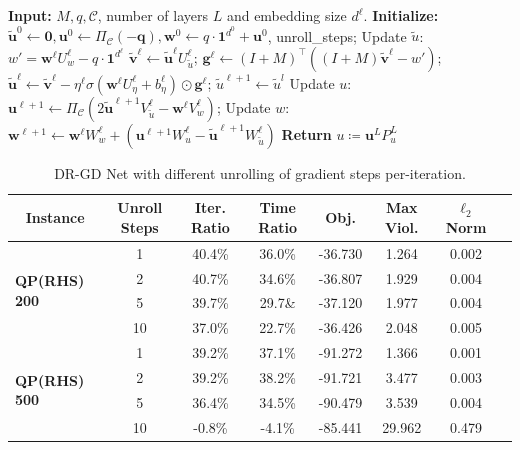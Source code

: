 \documentclass[10pt]{article} %
\begin{document}
\begin{algorithm}[h!]
\caption{DR-GD Net with multi-gradient steps}\label{alg:network_multistep}
\begin{algorithmic}[1]
\STATE \textbf{Input:} $M, q, \mathcal{C}$, number of layers $L$ and embedding size $d^\ell$.
\STATE \textbf{Initialize:} $\tilde{\mathbf{u}}^0 \gets \mathbf{0}, \mathbf{u}^0 \gets \Pi_\mathcal{C}(-\mathbf{q}), \mathbf{w}^0 \gets q \cdot \mathbf{1}^{d^0} + \mathbf{u}^0$, unroll\_steps; 
    \STATE Update $\tilde{u}$: $w'=\mathbf{w}^{\ell}U_w^\ell-q\cdot\mathbf{1}^{d^\ell}$ 
        \STATE $\tilde{\mathbf{v}}^{\ell} \gets \tilde{\mathbf{u}}^{\ell}U_{\tilde{u}}^\ell$;
        \STATE $\mathbf{g}^{\ell} \gets (I+M)^\top\left((I+M)\tilde{\mathbf{v}}^{\ell} - w'\right)$;
        \STATE $\tilde{\mathbf{u}}^{\ell} \gets \tilde{\mathbf{v}}^{\ell} - \eta^\ell\sigma\left(\mathbf{w}^{\ell}U_\eta^\ell + b_\eta^\ell\right) \odot \mathbf{g}^{\ell}$;
    \ENDFOR
    \STATE $\tilde{u}^{\ell+1} \gets \tilde{u}^l$
    \STATE Update $u$: $\mathbf{u}^{\ell+1} \gets \Pi_\mathcal{C} \left(2\tilde{\mathbf{u}}^{\ell+1} V_{\tilde{u}}^\ell - \mathbf{w}^{\ell}V_w^\ell \right)$;
    \STATE Update $w$: $\mathbf{w}^{\ell+1} \gets \mathbf{w}^{\ell}W_w^\ell + \left(\mathbf{u}^{\ell+1} W_u^\ell - \tilde{\mathbf{u}}^{\ell+1} W_{\tilde{u}}^\ell \right)$
\ENDFOR
\STATE \textbf{Return} $u \coloneqq \mathbf{u}^L P_u^{L}$
\end{algorithmic}
\end{algorithm}

\begin{table}[h!]
\centering
\caption{DR-GD Net with different unrolling of gradient steps per-iteration.}
\label{tab:unroll_steps_quality}
	\begin{tabular}{@{}l c c c c c c c}
    \toprule
       \multicolumn{1}{c}{\bf Instance} & \multicolumn{1}{c}{\bf Unroll Steps} & \multicolumn{1}{c}{\bf Iter. Ratio} &\multicolumn{1}{c}{\bf Time Ratio}& \multicolumn{1}{c}{\bf Obj.} &\multicolumn{1}{c}{\bf Max Viol.} &\multicolumn{1}{c}{\bf $\ell_2$ Norm} \\
        \midrule
        \multirow{4}{*}{\textbf{QP(RHS) 200}}
        & 1 &40.4\% & 36.0\% & -36.730 & 1.264 & 0.002\\
        &2 & 40.7\% & 34.6\%& -36.807 & 1.929 & 0.004 \\
        &5 & 39.7\% & 29.7\&& -37.120 & 1.977 & 0.004 \\
        &10& 37.0\% & 22.7\%& -36.426 & 2.048 & 0.005 \\
        \midrule
        \multirow{4}{*}{\textbf{QP(RHS) 500}}
        &1 & 39.2\% & 37.1\% & -91.272 & 1.366  & 0.001 \\
        &2 & 39.2\% & 38.2\%& -91.721  & 3.477 & 0.003 \\
        &5 & 36.4\% & 34.5\%& -90.479  & 3.539 & 0.004 \\
        &10& -0.8\% & -4.1\%& -85.441 & 29.962 &0.479 \\
	\bottomrule
	\end{tabular}
\end{table}
\end{document}
